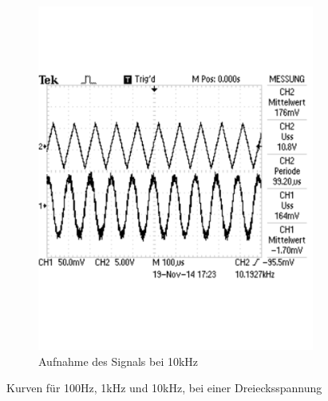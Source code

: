 \documentclass[12pt,a4paper]{article}
\begin{document}
\begin{figure}[H]
\begin{subfigure}[b]{0.28\textwidth}
                \includegraphics[width=\textwidth , scale = 0.4]{2_6_drei_10k.pdf}
                \caption[Aufnahme des Signals bei 10kHz]{Aufnahme des Signals bei 10kHz}
  				\label{fig:2_6_drei_10k}
        \end{subfigure}
        \caption{Kurven für 100Hz, 1kHz und 10kHz, bei einer Dreiecksspannung}
        \label{fig:2_6_drei}
\end{figure}
\end{document}
